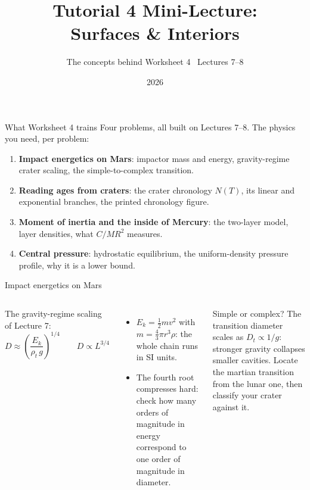 \documentclass[aspectratio=169, 11pt]{beamer}
\title[T4 mini-lecture: Surfaces \& Interiors]{Tutorial 4 Mini-Lecture:\\Surfaces \& Interiors}
\subtitle{The concepts behind Worksheet 4 \textbullet\ Lectures 7--8}
\author{}
\institute{Kapteyn Astronomical Institute\\University of Groningen}
\date{2026}
\begin{document}
\begin{frame}
  \titlepage
\end{frame}

\begin{frame}{What Worksheet 4 trains}
  Four problems, all built on Lectures 7--8. The physics you need, per problem:
  \vskip4pt\relax
  \begin{enumerate}
    \item \textbf{Impact energetics on Mars}: impactor mass and energy, gravity-regime crater scaling, the simple-to-complex transition.
    \item \textbf{Reading ages from craters}: the crater chronology $N(T)$, its linear and exponential branches, the printed chronology figure.
    \item \textbf{Moment of inertia and the inside of Mercury}: the two-layer model, layer densities, what $C/MR^2$ measures.
    \item \textbf{Central pressure}: hydrostatic equilibrium, the uniform-density pressure profile, why it is a lower bound.
  \end{enumerate}
  \vskip2pt\relax
\end{frame}

\begin{frame}{Impact energetics on Mars}
  \small
  \begin{columns}[T]
    The gravity-regime scaling of Lecture 7:
    \[
      \boxed{D \approx \left(\frac{E_k}{\rho_t\,g}\right)^{1/4}}
      \qquad D \propto L^{3/4}
    \]
    \begin{itemize}
      \item $E_k = \tfrac{1}{2}mv^2$ with $m = \tfrac{4}{3}\pi r^3 \rho$: the whole chain runs in SI units.
      \item The fourth root compresses hard: check how many orders of magnitude in energy correspond to one order of magnitude in diameter.
    \end{itemize}

    \begin{block}{Simple or complex?}
      The transition diameter scales as $D_t \propto 1/g$: stronger gravity collapses smaller cavities. Locate the martian transition from the lunar one, then classify your crater against it.
    \end{block}
  \end{columns}
\end{frame}
\end{document}
